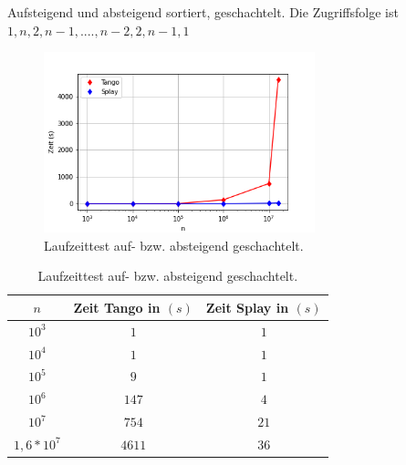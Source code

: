 \documentclass[a4paper,12pt]{article}
\begin{document}
\newpage
\noindent Aufsteigend und absteigend sortiert, geschachtelt. Die Zugriffsfolge ist $1, n, 2, n- 1,...., n - 2, 2, n -1, 1$
\begin{figure}[H]
	\centering
	\includegraphics[width=0.7\textwidth]{"Medien/laufzeittest/diagramm/sorted3"}
	\caption{Laufzeittest auf- bzw. absteigend geschachtelt.}
\end{figure}
\begin{table}[H]
	\begin{center}
		\begin{tabular}[c]{|c|c|c|}
			\hline
			$n$ & Zeit Tango in $\left(s\right)$ &Zeit Splay in $\left(s\right)$ \\
			\hline
			$10^3$ & $1$ &$1$ \\
			\hline
			$10^4$  & $1$ &$1$  \\
			\hline
			$10^5$  & $9$ &$1$  \\
			\hline
			$10^6$  & $147$ &$4$  \\
			\hline
			$10^7$  & $754$ &$21$  \\
			\hline
			$1,6 *10^7$  & $4611$ &$36$  \\
			\hline
		\end{tabular}
		\caption{Laufzeittest auf- bzw. absteigend geschachtelt.} 
	\end{center}
\end{table}


\end{document}
